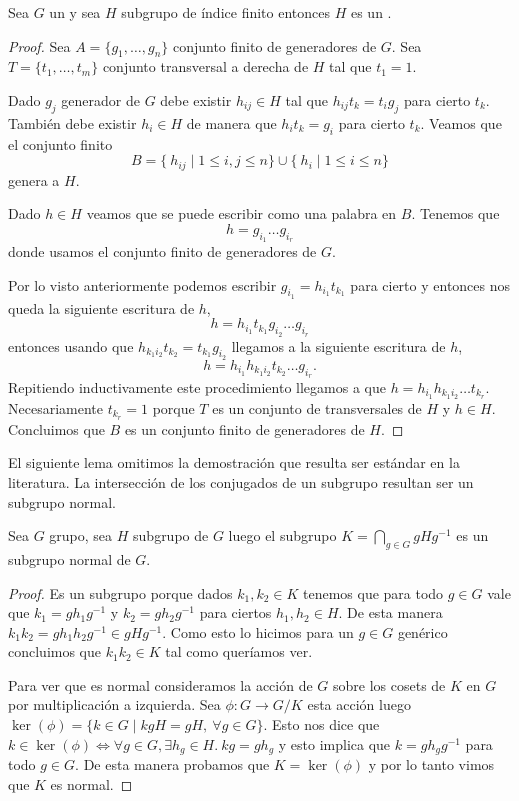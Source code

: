 \documentclass[tesis.tex]{subfiles}
\begin{document}
\begin{lema}\label{lema_subg_fg}
	Sea $G$ un \fg y sea $H$ subgrupo de índice finito entonces $H$ es un \fg.
\end{lema}
\begin{proof}
	Sea $A = \{g_1, \dots, g_n\}$ conjunto finito de generadores de $G$.
	Sea $T =\{t_1, \dots, t_m\}$ conjunto transversal a derecha de $H$ tal que $t_1=1$.
	
	Dado $g_j$ generador de $G$ debe existir $h_{ij} \in H$ tal que $h_{ij}t_{k} = t_ig_j$ para cierto $t_k$.
	También debe existir $h_i \in H$ de manera que $ h_i t_{k} = g_i$ para cierto $t_k$.
	Veamos que el conjunto finito 
	\[
	B = \{ \ h_{ ij}  \mid {1 \le i,j \le n } \} \cup \{ \ h_i \mid {1 \le i \le n} \}
	\]
	genera a $H$.
	
	Dado $h \in H$ veamos que se puede escribir como una palabra en $B$. 
	Tenemos que 
	\[
	h = g_{i_1}\dots g_{i_r}
	\]
	donde usamos el conjunto finito de generadores de $G$.
	
	Por lo visto anteriormente podemos escribir  $g_{i_1} = h_{i_1}t_{k_1}$ para cierto y entonces nos queda la siguiente escritura de $h$,
	\[
	h = h_{i_1}t_{k_1} g_{i_2}\dots g_{i_r}
	\]
	entonces usando que $h_{k_{1}i_{2}}t_{k_2} = t_{k_1}g_{i_2} $ llegamos a la siguiente escritura de $h$,
	\[
	h = h_{i_1}h_{k_{1}i_{2}}t_{k_2}\dots g_{i_r}.
	\]
	Repitiendo inductivamente este procedimiento llegamos a que $h =h_{i_1}h_{k_{1}i_{2}} \dots t_{k_r}$.
	Necesariamente $t_{k_r} = 1$ porque $T$ es un conjunto de transversales de $H$ y $h \in H$.
	Concluimos que $B$ es un conjunto finito de generadores de $H$.
	
\end{proof}


El siguiente lema omitimos la demostración que resulta ser estándar en la literatura.
La intersección de los conjugados de un subgrupo resultan ser un subgrupo normal.

\begin{lema}\label{lema_int_normal}
	Sea $G$ grupo, sea $H$ subgrupo de $G$ luego el subgrupo $K = \bigcap_{g \in G} gHg^{-1}$ es un subgrupo normal de $G$.
\end{lema}

\begin{proof}
	Es un subgrupo porque dados $k_{1}, k_{2} \in K$ tenemos que para todo $g \in G$ vale que $k_{1} = gh_{1}g^{-1}$ y $k_{2} = gh_{2}g^{-1}$ para ciertos $h_{1},h_{2} \in H$.
	De esta manera $k_{1}k_{2} = g h_{1}h_{2}g^{-1} \in gHg^{-1}$. 
	Como esto lo hicimos para un $g \in G$ genérico concluimos que $k_{1}k_{2} \in K$ tal como queríamos ver.
	
	Para ver que es normal consideramos la acción de $G$ sobre los cosets de $K$ en $G$ por multiplicación a izquierda.
	Sea $\phi:G \to G/K$ esta acción luego $\ker(\phi) = \{  k \in G \mid kgH = gH, \ \forall g \in G \}$. 
	Esto nos dice que $k \in \ker(\phi) \iff \forall g \in G, \exists h_{g} \in H. \ kg = gh_{g}$ y esto implica que $k = gh_{g}g^{-1}$ para todo $g \in G$.
	De esta manera probamos que $K = \ker(\phi)$ y por lo tanto vimos que $K$ es normal.
\end{proof}
\end{document}
